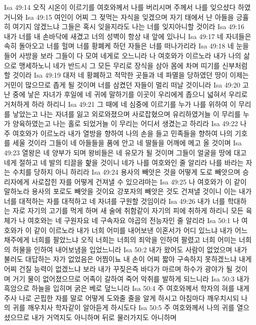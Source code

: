 Isa 49:14  오직 시온이 이르기를 여호와께서 나를 버리시며 주께서 나를 잊으셨다 하였거니와
Isa 49:15  여인이 어찌 그 젖먹는 자식을 잊겠으며 자기 태에서 난 아들을 긍휼히 여기지 않겠느냐 그들은 혹시 잊을지라도 나는 너를 잊지아니할 것이라
Isa 49:16  내가 너를 내 손바닥에 새겼고 너의 성벽이 항상 내 앞에 있나니
Isa 49:17  네 자녀들은 속히 돌아오고 너를 헐며 너를 황폐케 하던 자들은 너를 떠나가리라
Isa 49:18  네 눈을 들어 사방을 보라 그들이 다 모여 네게로 오느니라 나 여호와가 이르노라 내가 나의 삶으로 맹세하노니 네가 반드시 그 모든 무리로 장식을 삼아 몸에 차며 띠기를 신부처럼 할 것이라
Isa 49:19  대저 네 황폐하고 적막한 곳들과 네 파멸을 당하였던 땅이 이제는 거민이 많으므로 좁게 될 것이며 너를 삼켰던 자들이 멀리 떠날 것이니라
Isa 49:20  고난 중에 낳은 자녀가 후일에 네 귀에 말하기를 이곳이 우리에게 좁으니 넓혀서 우리로 거처하게 하라 하리니
Isa 49:21  그 때에 네 심중에 이르기를 누가 나를 위하여 이 무리를 낳았는고 나는 자녀를 잃고 외로와졌으며 사로잡혔으며 유리하였거늘 이 무리를 누가 양육하였는고 나는 홀로 되었거늘 이 무리는 어디서 생겼는고 하리라
Isa 49:22  나 주 여호와가 이르노라 내가 열방을 향하여 나의 손을 들고 민족들을 향하여 나의 기호를 세울 것이라 그들이 네 아들들을 품에 안고 네 딸들을 어깨에 메고 올 것이며
Isa 49:23  열왕은 네 양부가 되며 왕비들은 네 유모가 될 것이며 그들이 얼굴을 땅에 대고 네게 절하고 네 발의 티끌을 핥을 것이니 네가 나를 여호와인 줄 알리라 나를 바라는 자는 수치를 당하지 아니 하리라
Isa 49:24  용사의 빼앗은 것을 어떻게 도로 빼앗으며 승리자에게 사로잡힌 자를 어떻게 건져낼 수 있으랴마는
Isa 49:25  나 여호와가 이 같이 말하노라 용사의 포로도 빼앗을 것이요 강포자의 빼앗은 것도 건져낼 것이니 이는 내가 너를 대적하는 자를 대적하고 네 자녀를 구원할 것임이라
Isa 49:26  내가 너를 학대하는 자로 자기의 고기를 먹게 하며 새 술에 취함같이 자기의 피에 취하게 하리니 모든 육체가 나 여호와는 네 구원자요 네 구속자요 야곱의 전능자인 줄 알리라
Isa 50:1  나 여호와가 이 같이 이르노라 내가 너희 어미를 내어보낸 이혼서가 어디 있느냐 내가 어느 채주에게 너희를 팔았느냐 오직 너희는 너희의 죄악을 인하여 팔렸고 너희 어미는 너희의 허물을 인하여 내어보냄을 입었느니라
Isa 50:2  내가 왔어도 사람이 없었으며 내가 불러도 대답하는 자가 없었음은 어찜이뇨 내 손이 어찌 짧아 구속하지 못하겠느냐 내게 어찌 건질 능력이 없겠느냐 보라 내가 꾸짖은즉 바다가 마르며 하수가 광야가 될 것이며 거기 물이 없어졌으므로 어족이 갈하여 죽어 악취를 발하게 되느니라
Isa 50:3  내가 흑암으로 하늘을 입히며 굵은 베로 덮느니라
Isa 50:4  주 여호와께서 학자의 혀를 내게 주사 나로 곤핍한 자를 말로 어떻게 도와줄 줄을 알게 하시고 아침마다 깨우치시되 나의 귀를 깨우치사 학자같이 알아듣게 하시도다
Isa 50:5  주 여호와께서 나의 귀를 열으셨으므로 내가 거역지도 아니하며 뒤로 물러가지도 아니하며
